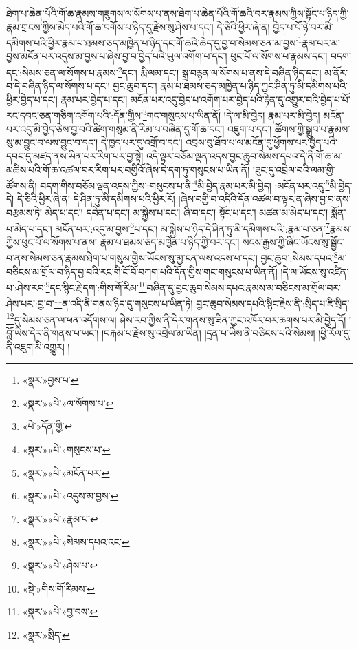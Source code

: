 ཐེག་པ་ཆེན་པོའི་གོ་ཆ་རྣམས་གཟུགས་ལ་སོགས་པ་ནས་ཐེག་པ་ཆེན་པོའི་གོ་ཆའི་བར་རྣམས་ཀྱིས་སྟོང་པ་ཉིད་ཀྱི་རྣམ་གྲངས་ཀྱིས་མེད་པའི་གོ་ཆ་བགོས་པ་ཉིད་དུ་རྗེས་སུ་ཤེས་པ་དང་། དེ་ཅིའི་ཕྱིར་ཞེ་ན། བྱེད་པ་པོ་ཉེ་བར་མི་དམིགས་པའི་ཕྱིར་རྣམ་པ་ཐམས་ཅད་མཁྱེན་པ་ཉིད་དང་གོ་ཆའི་ཆེད་དུ་བྱ་བ་སེམས་ཅན་མ་བྱས་\footnote{«སྣར་»བྱས་པ་}རྣམ་པར་མ་བྱས་མངོན་པར་འདུས་མ་བྱས་པ་ཞེས་བྱ་བ་བྱེད་པའི་ཡུལ་འགོག་པ་དང་། ཕུང་པོ་ལ་སོགས་པ་རྣམས་དང་། བདག་དང་:སེམས་ཅན་ལ་སོགས་པ་རྣམས་\footnote{«སྣར་»«པེ་»ལ་སོགས་པ་}དང་། རྨི་ལམ་དང་། སྒྲ་བརྙན་ལ་སོགས་པ་ནས་དེ་བཞིན་ཉིད་དང་། མ་ནོར་བ་དེ་བཞིན་ཉིད་ལ་སོགས་པ་དང་། བྱང་ཆུབ་དང་། རྣམ་པ་ཐམས་ཅད་མཁྱེན་པ་ཉིད་ཀྱང་ཤིན་ཏུ་མི་དམིགས་པའི་ཕྱིར་བྱེད་པ་དང་། རྣམ་པར་བྱེད་པ་དང་། མངོན་པར་འདུ་བྱེད་པ་འགོག་པར་བྱེད་པའི་རྟེན་དུ་འགྱུར་བའི་བྱེད་པ་པོ་རང་དབང་ཅན་གཅིག་འགོག་པའི་:དོན་གྱིས་\footnote{«པེ་»དོན་གྱི་}གང་གསུངས་པ་ཡིན་ནོ། །དེ་ལ་མི་བྱེད། རྣམ་པར་མི་བྱེད། མངོན་པར་འདུ་མི་བྱེད་ཅེས་བྱ་བའི་ཚིག་གསུམ་ནི་རིམ་པ་བཞིན་དུ་གོ་ཆ་དང་། འཇུག་པ་དང་། ཚོགས་ཀྱི་སྒྲུབ་པ་རྣམས་སུ་མ་བྱུང་བ་ལས་བྱུང་བ་དང་། དེ་ཁྱད་པར་དུ་འགྲོ་བ་དང་། འབྲས་བུ་ཐོབ་པ་ལ་མངོན་དུ་ཕྱོགས་པར་བྱེད་པའི་དབང་དུ་མཛད་ནས་ཡིན་པར་རིག་པར་བྱ་སྟེ། འདི་ལྟར་བཅོམ་ལྡན་འདས་བྱང་ཆུབ་སེམས་དཔའ་དེ་ནི་གོ་ཆ་མ་མཆིས་པའི་གོ་ཆ་འཚལ་བར་རིག་པར་བགྱིའོ་ཞེས་དེ་དག་ཏུ་གསུངས་པ་ཡིན་ནོ། །ཟུང་དུ་འབྲེལ་བའི་ལམ་གྱི་ཚོགས་ནི། བདག་གིས་བཅོམ་ལྡན་འདས་ཀྱིས་:གསུངས་པ་ནི་\footnote{«སྣར་»«པེ་»གསུངས་པ་}མི་བྱེད་རྣམ་པར་མི་བྱེད། :མངོན་པར་འདུ་\footnote{«སྣར་»«པེ་»མངོན་པར་}མི་བྱེད་དེ། དེ་ཅིའི་ཕྱིར་ཞེ་ན། དེ་ཤིན་ཏུ་མི་དམིགས་པའི་ཕྱིར་རོ། །ཞེས་བགྱི་བ་འདིའི་དོན་འཚལ་བ་ལྟར་ན་ཞེས་བྱ་བ་ནས་བརྩམས་ཏེ། མེད་པ་དང་། དབེན་པ་དང་། མ་སྐྱེས་པ་དང་། ཞི་བ་དང་། སྟོང་པ་དང་། མཚན་མ་མེད་པ་དང་། སྨོན་པ་མེད་པ་དང་། མངོན་པར་:འདུ་མ་བྱས་\footnote{«སྣར་»«པེ་»འདུས་མ་བྱས་}པ་དང་། མ་སྐྱེས་པ་ཉིད་དེ་ཤིན་ཏུ་མི་དམིགས་པའི་:རྣམ་པ་ཅན་\footnote{«སྣར་»«པེ་»རྣམ་པ་}རྣམས་ཀྱིས་ཕུང་པོ་ལ་སོགས་པ་ནས། རྣམ་པ་ཐམས་ཅད་མཁྱེན་པ་ཉིད་ཀྱི་བར་དང་། སངས་རྒྱས་ཀྱི་ཞིང་ཡོངས་སུ་སྦྱོང་བ་ནས་སེམས་ཅན་རྣམས་ཐེག་པ་གསུམ་གྱིས་ཡོངས་སུ་མྱ་ངན་ལས་འདས་པ་དང་། བྱང་ཆུབ་:སེམས་དཔའ་\footnote{«སྣར་»«པེ་»སེམས་དཔའ་འང་}མ་བཅིངས་མ་གྲོལ་བ་ཉིད་བྱ་བའི་རང་གི་ངོ་བོ་བཀག་པའི་དོན་གྱིས་གང་གསུངས་པ་ཡིན་ནོ། །དེ་ལ་ཡོངས་སུ་འཛིན་པ་:ཤེས་རབ་\footnote{«སྣར་»«པེ་»ཤེས་པ་}དང་སྙིང་རྗེ་དག་:གིས་གོ་རིམ་\footnote{«སྡེ་»གིས་གོ་རིམས་}བཞིན་དུ་བྱང་ཆུབ་སེམས་དཔའ་རྣམས་མ་བཅིངས་མ་གྲོལ་བར་ཤེས་པར་:བྱ་བ་\footnote{«སྣར་»«པེ་»བྱ་བས་}ན་འདི་ནི་གནས་ཉིད་དུ་གསུངས་པ་ཡིན་ཏེ། བྱང་ཆུབ་སེམས་དཔའི་སྙིང་རྗེས་ནི་:སྲིད་པ་ཇི་སྲིད་\footnote{«སྣར་»སྲིད་}དུ་སེམས་ཅན་ལ་ཕན་འདོགས་ལ། ཤེས་རབ་ཀྱིས་ནི་དེར་གནས་སུ་ཟིན་ཀྱང་འཁོར་བར་ཆགས་པར་མི་བྱེད་དོ། །བློ་ཡིས་དེར་ནི་གནས་པ་ཡང་། །བརྐམ་པ་རྗེས་སུ་འབྲེལ་མ་ཡིན། །དྲན་པ་ཡིས་ནི་བཅིངས་པའི་སེམས། །ཕྱི་རོལ་དུ་ནི་འཇུག་མི་འགྱུར། །
